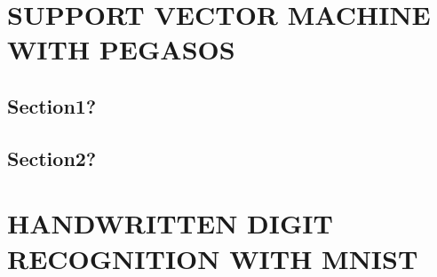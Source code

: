 \documentclass[a4paper,twoside]{article}
\begin{document}
\section{\uppercase{Support Vector Machine with Pegasos}}

\subsection{Section1?}


\subsection{Section2?}



\section{\uppercase{Handwritten Digit Recognition with MNIST}}


\vfill
\end{document}
